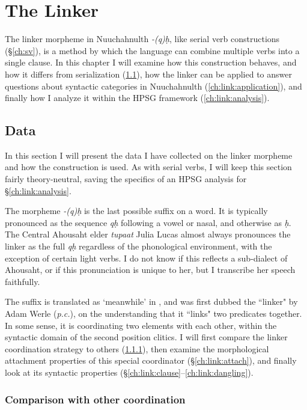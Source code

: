 \chapter{The Linker} \label{ch:link}

The linker morpheme in Nuuchahnulth \textit{-(q)ḥ}, like serial verb constructions (\S\ref{ch:sv}), is a method by which the language can combine multiple verbs into a single clause. In this chapter I will examine how this construction behaves, and how it differs from serialization (\ref{ch:link:data}), how the linker can be applied to answer questions about syntactic categories in Nuuchahnulth (\ref{ch:link:application}), and finally how I analyze it within the HPSG framework (\ref{ch:link:analysis}).

\section{Data} \label{ch:link:data}

In this section I will present the data I have collected on the linker morpheme and how the construction is used. As with serial verbs, I will keep this section fairly theory-neutral, saving the specifics of an HPSG analysis for \S\ref{ch:link:analysis}.

The morpheme \textit{-(q)ḥ} is the last possible suffix on a word. It is typically pronounced as the sequence \textit{qḥ} following a vowel or nasal, and otherwise as \textit{ḥ}. The Central Ahousaht elder \textit{tupaat} Julia Lucas almost always pronounces the linker as the full \textit{qḥ} regardless of the phonological environment, with the exception of certain light verbs. I do not know if this reflects a sub-dialect of Ahousaht, or if this pronunciation is unique to her, but I transcribe her speech faithfully.

The suffix is translated as `meanwhile' in \cite{sapir1939}, and was first dubbed the ``linker" by Adam Werle (\textit{p.c.}), on the understanding that it ``links" two predicates together. In some sense, it is coordinating two elements with each other, within the syntactic domain of the second position clitics. I will first compare the linker coordination strategy to others (\ref{ch:link:others}), then examine the morphological attachment properties of this special coordinator (\S\ref{ch:link:attach}), and finally look at its syntactic properties (\S\ref{ch:link:clause}--\ref{ch:link:dangling}).

\subsection{Comparison with other coordination} \label{ch:link:others}

